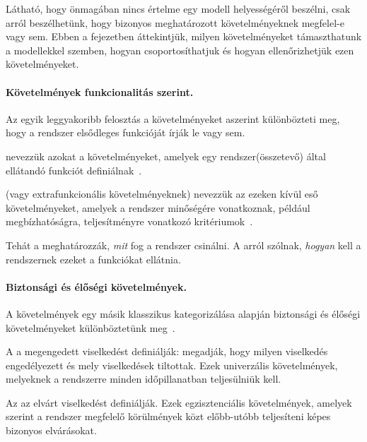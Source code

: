 Látható, hogy önmagában nincs értelme egy modell helyességéről beszélni, csak arról beszélhetünk, hogy bizonyos meghatározott követelményeknek megfelel-e vagy sem.
Ebben a fejezetben áttekintjük, milyen követelményeket támaszthatunk a modellekkel szemben, hogyan csoportosíthatjuk és hogyan ellenőrizhetjük ezen követelményeket.

\paragraph{Követelmények funkcionalitás szerint.}
Az egyik leggyakoribb felosztás a követelményeket aszerint különbözteti meg, hogy a rendszer elsődleges funkcióját írják le vagy sem.

\begin{definicio}
 nevezzük azokat a követelményeket, amelyek egy rendszer(összetevő) által ellátandó funkciót definiálnak~\cite{IEEE-24765}.
\end{definicio}
\begin{definicio}
 (vagy extrafunkcionális követelményeknek) nevezzük az ezeken kívül eső követelményeket, amelyek a rendszer minőségére vonatkoznak, például megbízhatóságra, teljesítményre vonatkozó kritériumok~\cite{IEEE-24765}.
\end{definicio}

\begin{megjegyzes}
Tehát a  meghatározzák, \emph{mit} fog a rendszer csinálni. A  arról szólnak, \emph{hogyan} kell a rendszernek ezeket a funkciókat ellátnia.
\end{megjegyzes}

\paragraph{Biztonsági és élőségi követelmények.}
A követelmények egy másik klasszikus kategorizálása alapján biztonsági és élőségi követelményeket különböztetünk meg~\cite{Lamport:1977}.

\begin{definicio}
A  a megengedett viselkedést definiálják: megadják, hogy milyen viselkedés engedélyezett és mely viselkedések tiltottak. Ezek univerzális követelmények, melyeknek a rendszerre minden időpillanatban teljesülniük kell.
\end{definicio}
\begin{definicio}
Az  az elvárt viselkedést definiálják.
Ezek egzisztenciális követelmények, amelyek szerint a rendszer megfelelő körülmények közt előbb-utóbb teljesíteni képes bizonyos elvárásokat.
\end{definicio}


